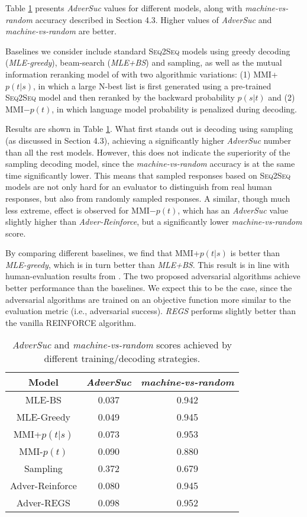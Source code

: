 \documentclass[11pt]{article}
\newcommand{\sts}{{{\textsc{Seq2Seq}}}\xspace}
\begin{document}
Table \ref{adv} presents
 {\it AdverSuc} values for different models, along with {\it machine-vs-random} accuracy described in Section 4.3. 
Higher values of  {\it AdverSuc}  and  {\it machine-vs-random} are better. 

Baselines we consider include standard \sts models using greedy decoding ({\it MLE-greedy}), beam-search ({\it MLE+BS}) and sampling, as well as the 
mutual information reranking model of  with two algorithmic variations: (1) MMI+$p(t|s)$, in which a large N-best list is first generated using a pre-trained \sts model and then reranked by the backward probability $p(s|t)$ and (2) MMI$-p(t)$, in which language model probability is penalized during decoding. 

Results are shown in Table \ref{adv}. What first stands out  is decoding using sampling (as discussed in Section 4.3), achieving a significantly higher {\it AdverSuc} number than all the rest models. 
However, this does not indicate the superiority of the sampling decoding model, since the {\it machine-vs-random} accuracy is at the same time significantly lower. This means that sampled responses based on \sts models are not only hard for an evaluator to distinguish from real human responses, but also from randomly sampled responses.
A similar, though much less extreme, effect is observed for MMI$-p(t)$, which has an {\it AdverSuc} value slightly higher than {\it Adver-Reinforce}, but a significantly lower {\it machine-vs-random} score. 

By comparing different baselines, we find that MMI+$p(t|s)$ is better than {\it MLE-greedy}, which is in turn better than {\it MLE+BS}. This result is in line with human-evaluation results from . 
The two proposed adversarial algorithms achieve better performance than the baselines. We expect this to be the case, since the adversarial algorithms are trained on an objective function 
more similar to the
evaluation metric (i.e., adversarial success). 
{\it REGS} performs slightly better than the vanilla REINFORCE algorithm. 

\begin{table}
\small
\centering
\begin{tabular}{ccc}
\hline
Model&{\it AdverSuc}&{\it machine-vs-random} \\\hline
MLE-BS&0.037&0.942 \\
MLE-Greedy&0.049&0.945 \\ 
MMI+$p(t|s)$&0.073&0.953\\
MMI-$p(t)$&0.090& 0.880\\
Sampling&0.372&0.679\\\hline
Adver-Reinforce&0.080&0.945 \\
Adver-REGS&0.098&0.952\\
\hline
\end{tabular}
\caption{{\it AdverSuc} and {\it machine-vs-random} scores achieved by different training/decoding strategies.}
\label{adv}
\end{table}
\end{document}
